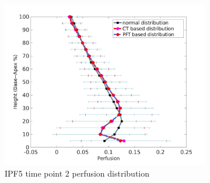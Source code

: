 \begin{figure}[htbp]
\begin{subfigure}{.6\linewidth}
  \includegraphics[width=\linewidth,trim={{.0\wd0} {.0\wd0} {.0\wd0} {.0\wd0}},clip]{Appendix/Image_AppexB/IPF501/IPF501_PerfusionAgainstLungHeight.png}
  \caption{IPF5 time point 2 perfusion distribution}
  \label{fig:VQDistribution-b}
\end{subfigure}
\begin{subfigure}{.6\linewidth}%

\end{subfigure}
\end{figure}
